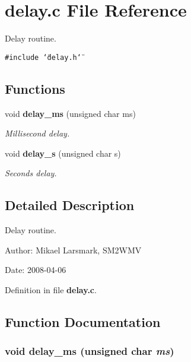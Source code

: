 \section{delay.c File Reference}
\label{delay_8c}
Delay routine.  


{\tt \#include \char`\"{}delay.h\char`\"{}}\par
\subsection*{Functions}
\begin{CompactItemize}
\item 
void {\bf delay\_\-ms} (unsigned char ms)
\begin{CompactList}\small\item\em Millisecond delay. \item\end{CompactList}\item 
void {\bf delay\_\-s} (unsigned char s)
\begin{CompactList}\small\item\em Seconds delay. \item\end{CompactList}\end{CompactItemize}


\subsection{Detailed Description}
Delay routine. 

\begin{Desc}
\item[Author:]Mikael Larsmark, SM2WMV \end{Desc}
\begin{Desc}
\item[Date:]2008-04-06 \end{Desc}


Definition in file {\bf delay.c}.

\subsection{Function Documentation}
\subsubsection[{delay\_\-ms}]{\setlength{\rightskip}{0pt plus 5cm}void delay\_\-ms (unsigned char {\em ms})}\label{delay_8c_7536158d6dfffb85a2bbb93957957a9d}


